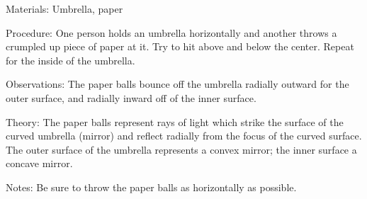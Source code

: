 \begin{multicols}{2}
\begin{description*}
\item[Materials:]{Umbrella, paper}
\item[Procedure:]{One person holds an umbrella horizontally and another throws a crumpled up piece of paper at it. Try to hit above and below the center. Repeat for the inside of the umbrella.}
\item[Observations:]{The paper balls bounce off the umbrella radially outward for the outer surface, and radially inward off of the inner surface.}
\item[Theory:]{The paper balls represent rays of light which strike the surface of the curved umbrella (mirror) and reflect radially from the focus of the curved surface. The outer surface of the umbrella represents a convex mirror; the inner surface a concave mirror.}
\item[Notes:]{Be sure to throw the paper balls as horizontally as possible.}
\end{description*}

%
%


\end{multicols}
